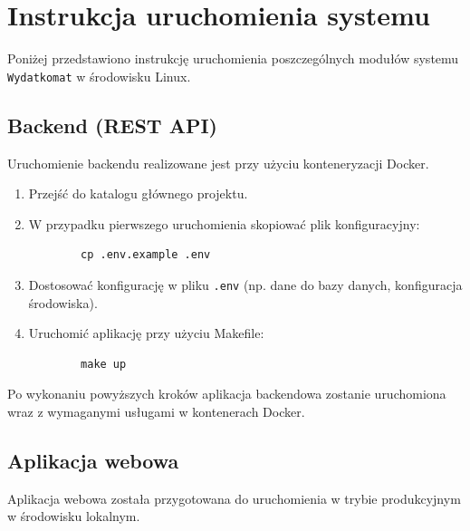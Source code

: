 \chapter{Instrukcja uruchomienia systemu}

Poniżej przedstawiono instrukcję uruchomienia poszczególnych modułów systemu \verb|Wydatkomat| w środowisku Linux.

\section{Backend (REST API)}

Uruchomienie backendu realizowane jest przy użyciu konteneryzacji Docker.

\begin{enumerate}
	\item Przejść do katalogu głównego projektu.
	\item W przypadku pierwszego uruchomienia skopiować plik konfiguracyjny:
	\begin{verbatim}
		cp .env.example .env
	\end{verbatim}
	\item Dostosować konfigurację w pliku \verb|.env| (np. dane do bazy danych, konfiguracja środowiska).
	\item Uruchomić aplikację przy użyciu Makefile:
	\begin{verbatim}
		make up
	\end{verbatim}
\end{enumerate}

Po wykonaniu powyższych kroków aplikacja backendowa zostanie uruchomiona wraz z wymaganymi usługami w kontenerach Docker.

\section{Aplikacja webowa}

Aplikacja webowa została przygotowana do uruchomienia w trybie produkcyjnym w środowisku lokalnym.

